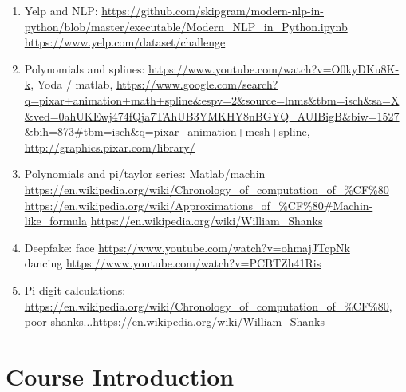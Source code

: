 \documentclass{article}
\begin{document}
\begin{enumerate}
\item Yelp and NLP: \url{https://github.com/skipgram/modern-nlp-in-python/blob/master/executable/Modern_NLP_in_Python.ipynb} \url{https://www.yelp.com/dataset/challenge}
\item Polynomials and splines: \url{https://www.youtube.com/watch?v=O0kyDKu8K-k}, Yoda / matlab, \url{https://www.google.com/search?q=pixar+animation+math+spline&espv=2&source=lnms&tbm=isch&sa=X&ved=0ahUKEwj474fQja7TAhUB3YMKHY8nBGYQ_AUIBigB&biw=1527&bih=873#tbm=isch&q=pixar+animation+mesh+spline}, \url{http://graphics.pixar.com/library/}
\item Polynomials and pi/taylor series: Matlab/machin \url{https://en.wikipedia.org/wiki/Chronology_of_computation_of_%CF%80} 
\url{https://en.wikipedia.org/wiki/Approximations_of_%CF%80#Machin-like_formula}
\url{https://en.wikipedia.org/wiki/William_Shanks}
\item Deepfake: face \url{https://www.youtube.com/watch?v=ohmajJTcpNk} \\
dancing \url{https://www.youtube.com/watch?v=PCBTZh41Ris}
\item Pi digit calculations: \url{https://en.wikipedia.org/wiki/Chronology_of_computation_of_%CF%80}, poor shanks...\url{https://en.wikipedia.org/wiki/William_Shanks}
\end{enumerate}


\section{Course Introduction}
\end{document}
